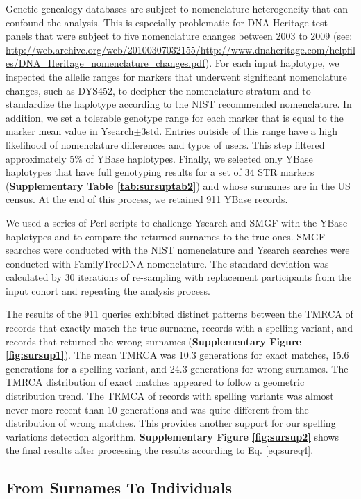 Genetic genealogy databases are subject to nomenclature heterogeneity that can confound the analysis. This is especially problematic for DNA Heritage test panels that were subject to five nomenclature changes between 2003 to 2009 (see: \url{http://web.archive.org/web/20100307032155/http://www.dnaheritage.com/helpfiles/DNA_Heritage_nomenclature_changes.pdf}). For each input haplotype, we inspected the allelic ranges for markers that underwent significant nomenclature changes, such as DYS452, to decipher the nomenclature stratum and to standardize the haplotype according to the NIST recommended nomenclature. In addition, we set a tolerable genotype range for each marker that is equal to the marker mean value in Ysearch$\pm$3std. Entries outside of this range have a high likelihood of nomenclature differences and typos of users. This step filtered approximately 5\% of YBase haplotypes. Finally, we selected only YBase haplotypes that have full genotyping results for a set of 34 STR markers (\textbf{Supplementary Table \ref{tab:sursuptab2}}) and whose surnames are in the US census. At the end of this process, we retained 911 YBase records.

We used a series of Perl scripts to challenge Ysearch and SMGF with the YBase haplotypes and to compare the returned surnames to the true ones. SMGF searches were conducted with the NIST nomenclature and Ysearch searches were conducted with FamilyTreeDNA nomenclature. The standard deviation was calculated by 30 iterations of re-sampling with replacement participants from the input cohort and repeating the analysis process.

The results of the 911 queries exhibited distinct patterns between the TMRCA of records that exactly match the true surname, records with a spelling variant, and records that returned the wrong surnames (\textbf{Supplementary Figure \ref{fig:sursup1}}). The mean TMRCA was 10.3 generations for exact matches, 15.6 generations for a spelling variant, and 24.3 generations for wrong surnames. The TMRCA distribution of exact matches appeared to follow a geometric distribution trend. The TRMCA of records with spelling variants was almost never more recent than 10 generations and was quite different from the distribution of wrong matches. This provides another support for our spelling variations detection algorithm. \textbf{Supplementary Figure \ref{fig:sursup2}} shows the final results after processing the results according to Eq. \ref{eq:sureq4}.

\subsection{From Surnames To Individuals}
